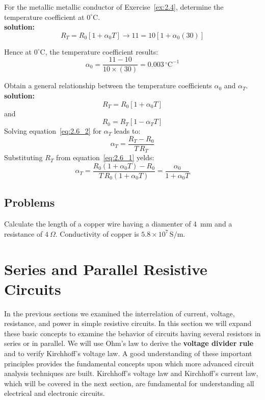 \begin{exercise}
For the metallic metallic conductor of Exercise~\ref{ex:2.4}, determine the temperature coefficient at $0^{\circ}\textrm{C}$.\\

\textbf{solution:}\\
\[R_T = R_0[1 + \alpha_0T]\longrightarrow 11 = 10[1 + \alpha_0(30)]\]

Hence at $0^{\circ}\textrm{C}$, the temperature coefficient results:
\[\alpha_0 = \frac{11-10}{10 \times (30)} = 0.003\,^{\circ}\textrm{C}^{-1}\]
\end{exercise}

\begin{exercise}
Obtain a general relationship between the temperature coefficients $\alpha_0$ and $\alpha_T$.\\

\textbf{solution:}\\
\begin{equation}
R_T = R_0[1 + \alpha_0 T]\label{eq:2.6_1}
\end{equation}
and
\begin{equation}
R_0 = R_T[1 - \alpha_T T]\label{eq:2.6_2}
\end{equation}
Solving equation~\ref{eq:2.6_2} for $\alpha_T$ leads to:
\begin{equation}
\alpha_T = \frac{R_T -R_0}{T\,R_T}\label{eq:2.6_3}
\end{equation}
Substituting $R_T$ from equation~\ref{eq:2.6_1} yelds:
\begin{equation}
\alpha_T = \frac{R_0(1 + \alpha_0 T) -R_0}{T\,R_0(1+\alpha_0T)} = \frac{\alpha_0}{1+\alpha_0T}
\end{equation}
\end{exercise}

\subsection*{Problems}
\begin{problem}
Calculate the length of a copper wire having a diamenter of 4~mm and a resistance of $4~\Omega$. Conductivity of copper is $5.8\times 10^7\,\textrm{S}/\textrm{m}$.
\end{problem}

\section{Series and Parallel Resistive Circuits}
In the previous sections we examined the interrelation of current, voltage, resistance, and power in simple resistive circuits. In this section we will expand these basic concepts to examine the behavior of circuits having several resistors in series or in parallel.
We will use Ohm’s law to derive the \textbf{voltage divider rule} and to verify Kirchhoff’s voltage law. A good understanding of these important principles provides the fundamental concepts upon which more advanced circuit analysis techniques are built. Kirchhoff’s voltage law and Kirchhoff’s current law, which will be covered in the next section, are fundamental for understanding all electrical and electronic circuits.

